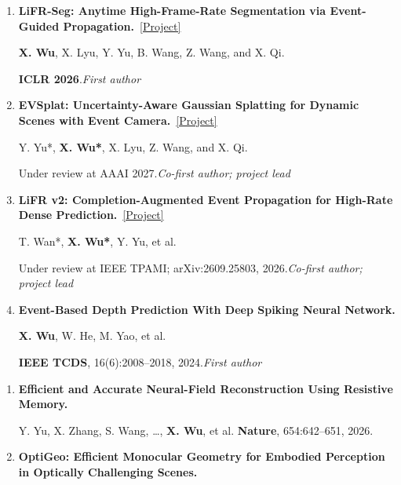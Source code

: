 \documentclass[a4paper]{article}
\newcommand{\pubgroup}[1]{%
  \par\vspace{2.0pt}{\color{cvblue}\fontsize{9.4}{10.4}\selectfont\bfseries #1}\par
}
\begin{document}
{\begin{enumerate}[leftmargin=1.6em,labelsep=0.38em,itemsep=0.4pt,topsep=1.3pt,parsep=0pt,partopsep=0pt]
Y. Yu*, \textbf{X. Wu*}, X. Hu, et al.\par
arXiv:2512.04519, 2025.\hfill\textcolor{cvblue}{\textit{Co-first author}}
\item \textbf{LiFR-Seg: Anytime High-Frame-Rate Segmentation via Event-Guided Propagation.}~\href{https://candy-crusher.github.io/xiaoshanwu.github.io/projects/lifr-seg/}{\textcolor{cvblue}{[Project]}}\par
\textbf{X. Wu}, X. Lyu, Y. Yu, B. Wang, Z. Wang, and X. Qi.\par
\textbf{ICLR 2026}.\hfill\textcolor{cvblue}{\textit{First author}}
\item \textbf{EVSplat: Uncertainty-Aware Gaussian Splatting for Dynamic Scenes with Event Camera.}~\href{https://candy-crusher.github.io/xiaoshanwu.github.io/projects/evsplat/}{\textcolor{cvblue}{[Project]}}\par
Y. Yu*, \textbf{X. Wu*\textdagger}, X. Lyu, Z. Wang, and X. Qi.\par
Under review at AAAI 2027.\hfill\textcolor{cvblue}{\textit{Co-first author; project lead}}
\item \textbf{LiFR v2: Completion-Augmented Event Propagation for High-Rate Dense Prediction.}~\href{https://candy-crusher.github.io/xiaoshanwu.github.io/projects/lifr-v2/}{\textcolor{cvblue}{[Project]}}\par
T. Wan*, \textbf{X. Wu*\textdagger}, Y. Yu, et al.\par
Under review at IEEE TPAMI; arXiv:2609.25803, 2026.\hfill\textcolor{cvblue}{\textit{Co-first author; project lead}}
\item \textbf{Event-Based Depth Prediction With Deep Spiking Neural Network.}\par
\textbf{X. Wu}, W. He, M. Yao, et al.\par
\textbf{IEEE TCDS}, 16(6):2008--2018, 2024.\hfill\textcolor{cvblue}{\textit{First author}}
\end{enumerate}
\pubgroup{Collaborative Work}
\begin{enumerate}[resume,leftmargin=1.6em,labelsep=0.38em,itemsep=0.4pt,topsep=1.3pt,parsep=0pt,partopsep=0pt]
\item \textbf{Efficient and Accurate Neural-Field Reconstruction Using Resistive Memory.}\par
Y. Yu, X. Zhang, S. Wang, \ldots, \textbf{X. Wu}, et al. \hfill \textbf{Nature}, 654:642--651, 2026.
\item \textbf{OptiGeo: Efficient Monocular Geometry for Embodied Perception in Optically Challenging Scenes.}\par

\end{enumerate}}
\end{document}
